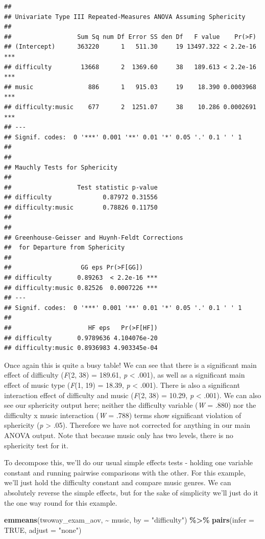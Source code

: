 \documentclass[
]{book}
\newenvironment{Shaded}{\begin{snugshade}}{\end{snugshade}}
\newcommand{\AttributeTok}[1]{\textcolor[rgb]{0.13,0.29,0.53}{#1}}
\newcommand{\ConstantTok}[1]{\textcolor[rgb]{0.56,0.35,0.01}{#1}}
\newcommand{\FunctionTok}[1]{\textcolor[rgb]{0.13,0.29,0.53}{\textbf{#1}}}
\newcommand{\NormalTok}[1]{#1}
\newcommand{\SpecialCharTok}[1]{\textcolor[rgb]{0.81,0.36,0.00}{\textbf{#1}}}
\newcommand{\StringTok}[1]{\textcolor[rgb]{0.31,0.60,0.02}{#1}}
\begin{document}
\begin{verbatim}
## 
## Univariate Type III Repeated-Measures ANOVA Assuming Sphericity
## 
##                  Sum Sq num Df Error SS den Df   F value    Pr(>F)    
## (Intercept)      363220      1   511.30     19 13497.322 < 2.2e-16 ***
## difficulty        13668      2  1369.60     38   189.613 < 2.2e-16 ***
## music               886      1   915.03     19    18.390 0.0003968 ***
## difficulty:music    677      2  1251.07     38    10.286 0.0002691 ***
## ---
## Signif. codes:  0 '***' 0.001 '**' 0.01 '*' 0.05 '.' 0.1 ' ' 1
## 
## 
## Mauchly Tests for Sphericity
## 
##                  Test statistic p-value
## difficulty              0.87972 0.31556
## difficulty:music        0.78826 0.11750
## 
## 
## Greenhouse-Geisser and Huynh-Feldt Corrections
##  for Departure from Sphericity
## 
##                   GG eps Pr(>F[GG])    
## difficulty       0.89263  < 2.2e-16 ***
## difficulty:music 0.82526  0.0007226 ***
## ---
## Signif. codes:  0 '***' 0.001 '**' 0.01 '*' 0.05 '.' 0.1 ' ' 1
## 
##                     HF eps   Pr(>F[HF])
## difficulty       0.9789636 4.104076e-20
## difficulty:music 0.8936983 4.903345e-04
\end{verbatim}

Once again this is quite a busy table! We can see that there is a significant main effect of difficulty (\emph{F}(2, 38) = 189.61, \emph{p} \textless{} .001), as well as a significant main effect of music type (\emph{F}(1, 19) = 18.39, \emph{p} \textless{} .001). There is also a significant interaction effect of difficulty and music (\emph{F}(2, 38) = 10.29, \emph{p} \textless{} .001). We can also see our sphericity output here; neither the difficulty variable (\emph{W} = .880) nor the difficulty x music interaction (\emph{W} = .788) terms show significant violation of sphericity (\emph{p} \textgreater{} .05). Therefore we have not corrected for anything in our main ANOVA output. Note that because music only has two levels, there is no sphericity test for it.

To decompose this, we'll do our usual simple effects tests - holding one variable constant and running pairwise comparisons with the other. For this example, we'll just hold the difficulty constant and compare music genres. We can absolutely reverse the simple effects, but for the sake of simplicity we'll just do it the one way round for this example.

\begin{Shaded}
\begin{Highlighting}[]
\FunctionTok{emmeans}\NormalTok{(twoway\_exam\_aov, }\SpecialCharTok{\textasciitilde{}}\NormalTok{ music, }\AttributeTok{by =} \StringTok{"difficulty"}\NormalTok{) }\SpecialCharTok{\%\textgreater{}\%}
  \FunctionTok{pairs}\NormalTok{(}\AttributeTok{infer =} \ConstantTok{TRUE}\NormalTok{, }\AttributeTok{adjust =} \StringTok{"none"}\NormalTok{)}
\end{Highlighting}
\end{Shaded}
\end{document}

